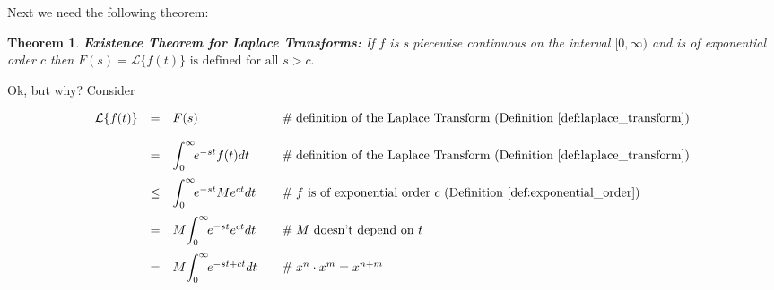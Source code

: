 \documentclass{article}
\newtheorem{thm}{Theorem}[section]
\theoremstyle{definition}
\begin{document}
\bigskip
\noindent
Next we need the following theorem:

\newpage

\begin{thm} 
{\bf Existence Theorem for Laplace Transforms:} 
\normalfont If $f$ is s piecewise continuous on the interval $[0,\infty)$ and is of exponential order $c$ then 
$F (s) = \mathcal{L}\{f (t)\} \text{ is defined for all $s > c$}.$
\end{thm}

\bigskip
\noindent
Ok, but why? Consider

\begin{equation*}
\begin{array}{lllll}
\mathcal{L}\{f(t)\}
&=& F(s)                                                                            &\quad  \mathrel{\#} \text{definition of the Laplace Transform (Definition \ref{def:laplace_transform})}                                                              \\  
[12pt]                                                                                 %
&=&   \mathlarger{\int}_0^\infty \! e^{-st} f(t) dt                  &\quad  \mathrel{\#} \text{definition of the Laplace Transform (Definition \ref{def:laplace_transform})}                                                              \\  
[12pt]                                                                                 %
&\leq& \mathlarger{\int}_0^\infty \! e^{-st}  Me^{ct}dt         &\quad  \mathrel{\#} \text{$f$ is of exponential order $c$ (Definition \ref{def:exponential_order})}                                                                     \\  
[12pt]                                                                                 %
&=& M \mathlarger{\int}_0^\infty \! e^{-st} e^{ct} dt           &\quad  \mathrel{\#} \text{$M$ doesn't depend on $t$}                                                                                                                                        \\   
[12pt]                                                                                %
&=& M \mathlarger{\int}_0^\infty \! e^{-st + ct}  dt             &\quad  \mathrel{\#} \text{$x^n \cdot x^m = x^{n+m}$}                                                                                                                                         \\      

\end{array}
\end{equation*}
\end{document}

